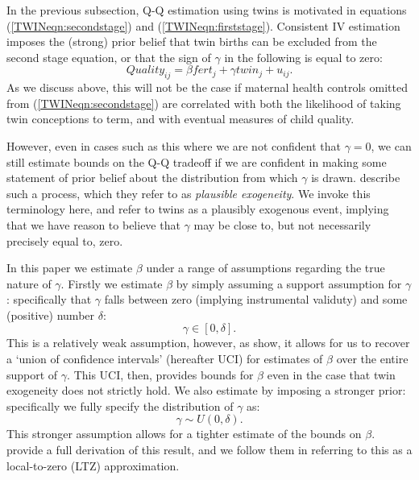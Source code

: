 
In the previous subsection, Q-Q estimation using twins is motivated in equations 
(\ref{TWINeqn:secondstage}) and (\ref{TWINeqn:firststage}).  Consistent IV
estimation imposes the (strong) prior belief that twin births can be excluded 
from the second stage equation, or that the sign of $\gamma$ in the following 
is equal to zero:
\begin{equation}
\label{TWINeqn:Conley}
Quality_{ij}=\beta fert_j + \gamma twin_j + u_{ij}.
\end{equation}
As we discuss above, this will not be the case if maternal health controls 
omitted from (\ref{TWINeqn:secondstage}) are correlated with both the 
likelihood of taking twin conceptions to term, and with eventual measures of 
child quality.

However, even in cases such as this where we are not confident that $\gamma=0$,
we can still estimate bounds on the Q-Q tradeoff if we are confident in making
some statement of prior belief about the distribution from which $\gamma$ is 
drawn.  \citet{Conleyetal2012} describe such a process, which they refer to as 
\emph{plausible exogeneity}.  We invoke this terminology here, and refer to 
twins as a plausibly exogenous event, implying that we have reason to believe 
that $\gamma$ may be close to, but not necessarily precisely equal to, zero.

In this paper we estimate $\beta$ under a range of assumptions regarding the
true nature of $\gamma$.  Firstly we estimate $\beta$ by simply assuming a
support assumption for $\gamma$: specifically that $\gamma$ falls between 
zero (implying instrumental validuty) and some (positive) number $\delta$:
\begin{equation}
\label{TWINeqn:uci}
\gamma \in [0,\delta].
\end{equation}
This is a relatively weak assumption, however, as \citet{Conleyetal2012} show,
it allows for us to recover a `union of confidence intervals' (hereafter UCI) 
for estimates of $\beta$ over the entire support of $\gamma$.  This UCI, then, 
provides bounds for $\beta$ even in the case that twin exogeneity does not 
strictly hold. We also estimate 
by imposing a stronger prior: specifically we fully specify the distribution of
$\gamma$ as:
\begin{equation}
\label{TWINeqn:ltz}
\gamma \sim U(0,\delta).
\end{equation}
This stronger assumption allows for a tighter estimate of the bounds on $\beta$.
\citet{Conleyetal2012} provide a full derivation of this result, and we follow
them in referring to this as a local-to-zero (LTZ) approximation.

